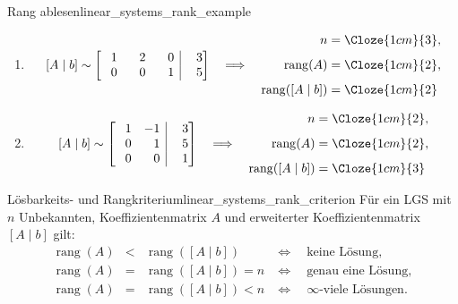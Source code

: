 \begin{ExampleBox}{Rang ablesen}{linear_systems_rank_example}
  \begin{enumerate}[label=\alph*),leftmargin=1.8em,itemsep=1.3em]
    \item
      \[
        [A\mid b]\sim
        \left[
          \begin{array}{@{}rrr|r@{}}
            \phantom{-}1&\phantom{-}2&\phantom{-}0&\phantom{-}3\\
            \phantom{-}0&\phantom{-}0&\phantom{-}1&\phantom{-}5
          \end{array}
        \right]
        \quad\Longrightarrow\quad
        \begin{aligned}
          n&=\Cloze{1cm}{3},\\[0.5em]
          \operatorname{rang}(A)&=\Cloze{1cm}{2},\\[0.5em]
          \operatorname{rang}([A\mid b])&=\Cloze{1cm}{2}
        \end{aligned}
      \]

    \item
      \[
        [A\mid b]\sim
        \left[
          \begin{array}{@{}rr|r@{}}
            \phantom{-}1&-1&\phantom{-}3\\
            \phantom{-}0&\phantom{-}1&\phantom{-}5\\
            \phantom{-}0&\phantom{-}0&\phantom{-}1
          \end{array}
        \right]
        \quad\Longrightarrow\quad
        \begin{aligned}
          n&=\Cloze{1cm}{2},\\[0.5em]
          \operatorname{rang}(A)&=\Cloze{1cm}{2},\\[0.5em]
          \operatorname{rang}([A\mid b])&=\Cloze{1cm}{3}
        \end{aligned}
      \]
  \end{enumerate}
\end{ExampleBox}

\begin{TheoremBox}{Lösbarkeits- und Rangkriterium}{linear_systems_rank_criterion}
  Für ein LGS mit $n$ Unbekannten, Koeffizientenmatrix $A$ und erweiterter
  Koeffizientenmatrix $[A\mid b]$ gilt:
  \[
    \begin{array}{rcll}
      \operatorname{rang}(A)
      &<&\operatorname{rang}([A\mid b])
      &\Longleftrightarrow\quad \text{keine Lösung},\\[0.7em]
      \operatorname{rang}(A)
      &=&\operatorname{rang}([A\mid b])=n
      &\Longleftrightarrow\quad \text{genau eine Lösung},\\[0.7em]
      \operatorname{rang}(A)
      &=&\operatorname{rang}([A\mid b])<n
      &\Longleftrightarrow\quad \infty\text{-viele Lösungen}.
    \end{array}
  \]
\end{TheoremBox}


